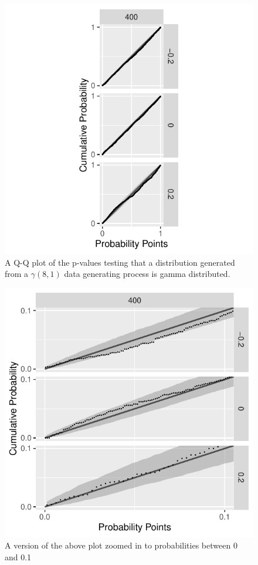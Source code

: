 \documentclass[12pt, letterpaper]{article}
\begin{document}
\begin{figure}[tbp]
  \centering
  \includegraphics[scale=1]{figures/gamma}
  \caption{A Q-Q plot of the p-values testing that a distribution
  generated from a $\gamma(8,1)$ data generating process is gamma distributed.}
  \label{fig:mu}
\end{figure}

\begin{figure}[tbp]
  \centering
  \includegraphics[scale=1]{figures/zoom_gamma}
  \caption{A version of the above plot zoomed in to probabilities between 0 and
  0.1}
  \label{fig:mu}
\end{figure}
\end{document}
